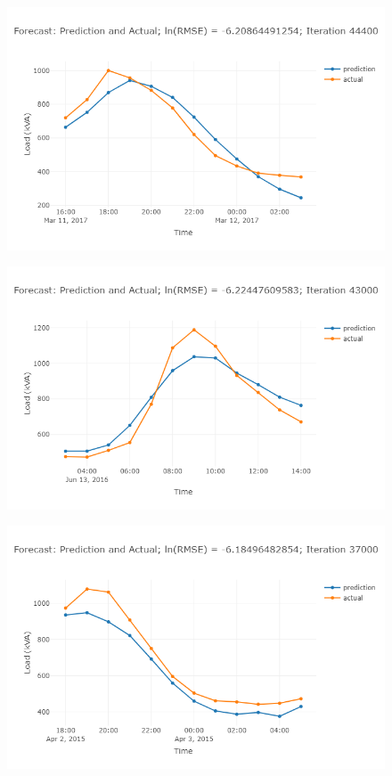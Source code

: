 \begin{figure}
\centering
\includegraphics[width=0.95\linewidth]{"images/prelim-plots/newplot (5)"}
\caption{}
\end{figure}

\begin{figure}
\centering
\includegraphics[width=0.95\linewidth]{"images/prelim-plots/newplot (6)"}
\caption{}
\end{figure}

\begin{figure}
\centering
\includegraphics[width=0.95\linewidth]{"images/prelim-plots/newplot (7)"}
\caption{}
\end{figure}

